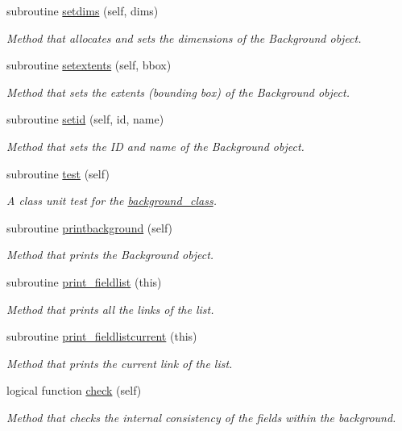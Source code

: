 \begin{DoxyCompactItemize}
subroutine \mbox{\hyperlink{namespacebackground__mod_a06d96d4627391d74feb105a842a87dc0}{setdims}} (self, dims)
\begin{DoxyCompactList}\small\item\em Method that allocates and sets the dimensions of the Background object. \end{DoxyCompactList}\item 
subroutine \mbox{\hyperlink{namespacebackground__mod_ae8871564866fdd657a25f6a5a2256c33}{setextents}} (self, bbox)
\begin{DoxyCompactList}\small\item\em Method that sets the extents (bounding box) of the Background object. \end{DoxyCompactList}\item 
subroutine \mbox{\hyperlink{namespacebackground__mod_a4feaccf688558d8590ece4f09c65c977}{setid}} (self, id, name)
\begin{DoxyCompactList}\small\item\em Method that sets the ID and name of the Background object. \end{DoxyCompactList}\item 
subroutine \mbox{\hyperlink{namespacebackground__mod_a3cee95b9b5d3aae83df33334981f2b27}{test}} (self)
\begin{DoxyCompactList}\small\item\em A class \textquotesingle{}unit\textquotesingle{} test for the \mbox{\hyperlink{structbackground__mod_1_1background__class}{background\+\_\+class}}. \end{DoxyCompactList}\item 
subroutine \mbox{\hyperlink{namespacebackground__mod_a8a8f225cffcddb742f22a402155b703f}{printbackground}} (self)
\begin{DoxyCompactList}\small\item\em Method that prints the Background object. \end{DoxyCompactList}\item 
subroutine \mbox{\hyperlink{namespacebackground__mod_acdcc52b4fb298bc145a121f9e8a4b929}{print\+\_\+fieldlist}} (this)
\begin{DoxyCompactList}\small\item\em Method that prints all the links of the list. \end{DoxyCompactList}\item 
subroutine \mbox{\hyperlink{namespacebackground__mod_a2bd18f3830c0667741efd086d36753db}{print\+\_\+fieldlistcurrent}} (this)
\begin{DoxyCompactList}\small\item\em Method that prints the current link of the list. \end{DoxyCompactList}\item 
logical function \mbox{\hyperlink{namespacebackground__mod_af2f517e4aa946491744e012153045bd4}{check}} (self)
\begin{DoxyCompactList}\small\item\em Method that checks the internal consistency of the fields within the background. \end{DoxyCompactList}\end{DoxyCompactItemize}


